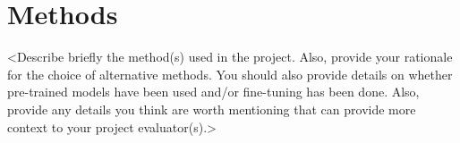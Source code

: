 \section{Methods}
\label{sec:methods}

<Describe briefly the method(s) used in the project. Also, provide your
rationale for the choice of alternative methods. You should also provide
details on whether pre-trained models have been used and/or fine-tuning has
been done. Also, provide any details you think are worth mentioning that can
provide more context to your project evaluator(s).>
